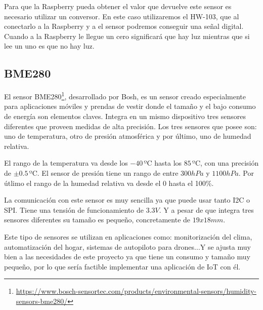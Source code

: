 \documentclass[a4paper, 12pt]{book}
\begin{document}
Para que la Raspberry pueda obtener el valor que devuelve este sensor es necesario utilizar un conversor. En este caso utilizaremos el HW-103, que al conectarlo a la Raspberry y a el sensor podremos conseguir una señal digital. Cuando a la Raspberry le llegue un cero significará que hay luz mientras que si lee un uno es que no hay luz.

\subsection{BME280}
\label{subsec:bme280}

El sensor BME280\footnote{\url{https://www.bosch-sensortec.com/products/environmental-sensors/humidity-sensors-bme280/}}, desarrollado por Bosh, es un sensor creado especialmente para aplicaciones móviles y prendas de vestir donde el tamaño y el bajo consumo de energía son elementos claves. Integra en un mismo dispositivo tres sensores diferentes que proveen medidas de alta precisión. Los tres sensores que posee son: uno de temperatura, otro de presión atmosférica y por último, uno de humedad relativa. 

El rango de la temperatura va desde los $-40\, \mbox{ºC}$ hasta los $85\, \mbox{ºC}$, con una precisión de $\pm 0.5\, \mbox{ºC}$. El sensor de presión tiene un rango de entre $300 hPa$ y $1100 hPa$. Por útlimo el rango de la humedad relativa va desde el 0 hasta el 100\%.

La comunicación con este sensor es muy sencilla ya que puede usar tanto I2C o SPI. Tiene una tensión de funcionamiento de $3.3V$. Y a pesar de que integra tres sensores diferentes su tamaño es pequeño, concretamente de $19x18 mm$.

Este tipo de sensores se utilizan en aplicaciones como: monitorización del clima, automatización del hogar, sistemas de autopiloto para drones...Y se ajusta muy bien a las necesidades de este proyecto ya que tiene un consumo y tamaño muy pequeño, por lo que sería factible implementar una aplicación de IoT con él.

\end{document}
